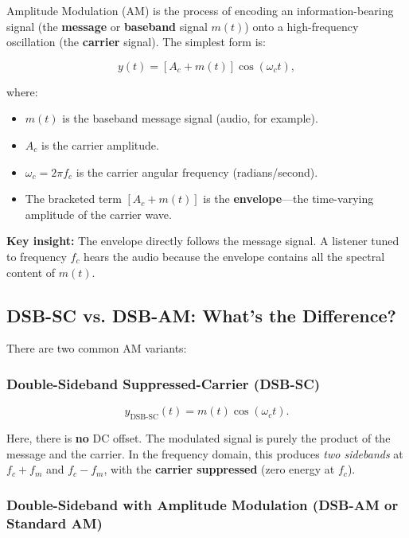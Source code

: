 \documentclass[11pt,letterpaper]{article}
\begin{document}
Amplitude Modulation (AM) is the process of encoding an information-bearing signal (the \textbf{message} or \textbf{baseband} signal $m(t)$) onto a high-frequency oscillation (the \textbf{carrier} signal). The simplest form is:

\begin{equation}
y(t) = [A_c + m(t)] \cos(\omega_c t),
\label{eq:am_basic}
\end{equation}

\noindent
where:
\begin{itemize}
    \item $m(t)$ is the baseband message signal (audio, for example).
    \item $A_c$ is the carrier amplitude.
    \item $\omega_c = 2 \pi f_c$ is the carrier angular frequency (radians/second).
    \item The bracketed term $[A_c + m(t)]$ is the \textbf{envelope}—the time-varying amplitude of the carrier wave.
\end{itemize}

\noindent
\textbf{Key insight:} The envelope directly follows the message signal. A listener tuned to frequency $f_c$ hears the audio because the envelope contains all the spectral content of $m(t)$.

\subsection{DSB-SC vs. DSB-AM: What's the Difference?}

There are two common AM variants:

\subsubsection*{Double-Sideband Suppressed-Carrier (DSB-SC)}

\begin{equation}
y_{\text{DSB-SC}}(t) = m(t) \cos(\omega_c t).
\label{eq:dsbsc}
\end{equation}

\noindent
Here, there is \textbf{no} DC offset. The modulated signal is purely the product of the message and the carrier. In the frequency domain, this produces \textit{two sidebands} at $f_c + f_m$ and $f_c - f_m$, with the \textbf{carrier suppressed} (zero energy at $f_c$).

\subsubsection*{Double-Sideband with Amplitude Modulation (DSB-AM or Standard AM)}
\end{document}
